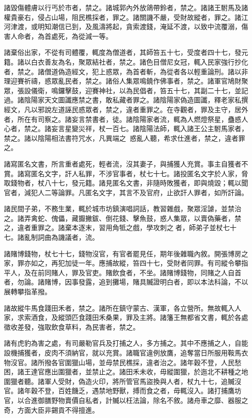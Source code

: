 \begin{pinyinscope}
 諸毀傷體膚以行丐於市者，禁之。諸城郭內外放鴿帶鈴者，禁之。諸諸王駙馬及諸權貴豪右，侵占山場，阻民樵採者，罪之。諸關譏不嚴，受財故縱者，罪之。諸江河津渡，或明知潮信已到，及風濤將起，貪索渡錢，淹延不渡，以致中流覆溺，傷害人命者，為首處死，為從減一等。



 諸棄俗出家，不從有司體覆，輒度為僧道者，其師笞五十七，受度者四十七，發元籍。諸以白衣善友為名，聚眾結社者，禁之。諸色目僧尼女冠，輒入民家強行抄化者，禁之。諸僧道偽造經文，犯上惑眾，為首者斬，為從者各以輕重論刑。諸以非理迎賽祈禱，惑眾亂民者，禁之。諸俗人集眾鳴鐃作佛事者，禁之。諸軍官鳩財聚眾，張設儀衛，鳴鑼擊鼓，迎賽神社，以為民倡者，笞五十七，其副二十七，並記過。諸陰陽家天文圖讖應禁之書，敢私藏者罪之。諸陰陽家偽造圖讖，釋老家私撰經文，凡以邪說左道誣民惑眾者，禁之，違者重罪之。在寺觀者，罪及主守，居外者，所在有司察之。諸妄言禁書者，徒。諸陰陽家者流，輒為人燃燈祭星，蠱惑人心者，禁之。諸妄言星變災祥，杖一百七。諸陰陽法師，輒入諸王公主駙馬家者，禁之。諸以陰陽相法書符咒水，凡異端之，惑亂人聽，希求仕進者，禁之，違者罪之。



 諸寫匿名文書，所言重者處死，輕者流，沒其妻子，與捕獲人充賞。事主自獲者不賞。諸寫匿名文字，訐人私罪，不涉官事者，杖七十七。諸投匿名文字於人家，脅取錢物者，杖八十七，發元籍。諸見匿名文書，非隨時敗獲者，即與燒毀；輒以聞官者，減犯人二等論罪。凡匿名文字，其言不及官府，止欲訐人罪者，如所訐論。



 諸民間子弟，不務生業，輒於城市坊鎮演唱詞話，教習雜戲，聚眾淫謔，並禁治之。諸弄禽蛇、傀儡，藏擫撇鈸、倒花錢、擊魚鼓，惑人集眾，以賣偽藥者，禁之，違者重罪之。諸棄本逐末，習用角牴之戲，學攻刺之者，師弟子並杖七十七。諸亂制詞曲為譏議者，流。



 諸賭博錢物，杖七十七，錢物沒官，有官者罷見任，期年後雜職內敘。開張博房之家，罪亦如之，再犯加徒一年。應捕故縱，笞四十七，受財者同罪。有司縱令攀指平人，及在前同賭人，罪及官吏。賭飲食者，不坐。諸賭博錢物，同賭之人自首者，勿論。諸賭博，因事發露，追到攤場，賭具贓證明白者，即以本法科論，不以展轉攀指革撥。



 諸故縱牛馬食踐田禾者，禁之。諸所在鎮守蒙古、漢軍，各立營所。無故輒入人家，求索酒食，及縱頭匹食踐田禾桑果，罪及主將。諸籓王無都省文書，輒於各處徵收差發，強取飲食草料，為民害者，禁之。



 諸有虎豹為害之處，有司嚴勒官兵及打捕之人，多方捕之。其中不應捕之人，自能設機捕獲者，皮肉不須納官，就以充賞。諸職官違例放鷹，追奪當日所服用鞍馬衣物沒官。諸所撥各官圍獵山場，並毋禁民樵採，違者治之。諸年穀不登，人民愁困，諸王達官應出圍獵者，並禁止之。諸田禾未收，毋縱圍獵，於迤北不耕種之地圍獵者聽。諸軍人受財，偽造火印，將所管官馬盜換與人者，杖九十七，追贓沒官。諸年穀不登，百姓饑乏，遇禁地野獸，搏而食之者，毋輒沒入。諸打捕鷹坊官，以合進御膳野物賣價自私者，計贓以枉法論，除名不敘。諸舟車之靡、器服之奇，方面大臣非錫貢不得擅進。




\end{pinyinscope}
